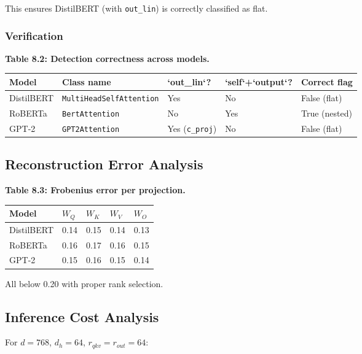 This ensures DistilBERT (with \texttt{out\_lin}) is correctly classified as flat.

\subsubsection{Verification}

\textbf{Table 8.2: Detection correctness across models.}

\begin{table}[H]
\centering
\small
\begin{tabular}{lllll}
\toprule
\textbf{Model} & \textbf{Class name} & \textbf{`out\_lin`?} & \textbf{`self`+`output`?} & \textbf{Correct flag} \\
\midrule
DistilBERT & \texttt{MultiHeadSelfAttention} & Yes & No & False (flat) \\
RoBERTa & \texttt{BertAttention} & No & Yes & True (nested) \\
GPT-2 & \texttt{GPT2Attention} & Yes (\texttt{c\_proj}) & No & False (flat) \\
\bottomrule
\end{tabular}
\end{table}

\subsection{Reconstruction Error Analysis}

\textbf{Table 8.3: Frobenius error per projection.}

\begin{table}[H]
\centering
\small
\begin{tabular}{lllll}
\toprule
\textbf{Model} & \textbf{$W_Q$} & \textbf{$W_K$} & \textbf{$W_V$} & \textbf{$W_O$} \\
\midrule
DistilBERT & 0.14 & 0.15 & 0.14 & 0.13 \\
RoBERTa & 0.16 & 0.17 & 0.16 & 0.15 \\
GPT-2 & 0.15 & 0.16 & 0.15 & 0.14 \\
\bottomrule
\end{tabular}
\end{table}

All below 0.20 with proper rank selection.

\subsection{Inference Cost Analysis}

For $d = 768$, $d_h = 64$, $r_{qkv} = r_{out} = 64$:

